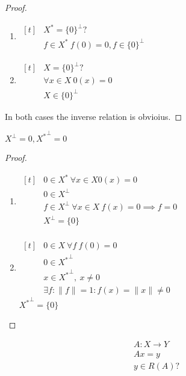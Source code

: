 \begin{proof}\leavevmode
  \begin{enumerate}
  \item
    $\begin{aligned}[t]
      &X^* = \{0\}^\perp ? \\
      &f \in X^*\ f(0) = 0, f \in \{0\}^\perp
    \end{aligned}$
  \item
    $\begin{aligned}[t]
      &X = \{0\}^\perp ?\\
      &\forall x \in X\ 0(x) = 0 \\
      &X \in \{0\}^\perp
    \end{aligned}$ 
  \end{enumerate}
  In both cases the inverse relation is obvioius.
\end{proof}

\begin{stm}
  $X^\perp = {0}, {X^*}^\perp = {0}$
\end{stm}

\begin{proof}\leavevmode
  \begin{enumerate}
  \item 
    $\begin{aligned}[t]
      &0 \in X^*\ \forall x \in X 0(x) = 0 \\
      &0 \in X^\perp \\
      &f \in X^\perp\ \forall x \in X\ f(x) = 0 \implies f = 0 \\
      &X^\perp = \{0\} \\
    \end{aligned}$
  \item
    $\begin{aligned}[t]
      &0 \in X\ \forall f\ f(0) = 0\\
      &0 \in {X^*}^\perp \\
      &x \in {X^*}^\perp,\ x \neq 0\\
      &\exists f: \|f\| = 1 : f(x) = \|x\| \neq 0
    \end{aligned}$ \\
    ${X^*}^\perp = \{0\}$ \qedhere
  \end{enumerate}
\end{proof}

\noindent
\begin{gather*}
  A \colon X \to Y \\
  A x = y \\
  y \in R(A)?
\end{gather*}

